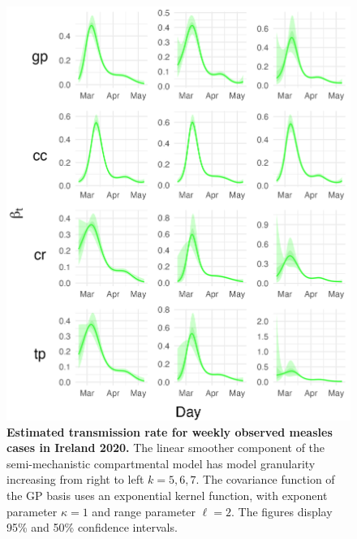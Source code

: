 \documentclass[
11pt, %
oneside, %
english, %
singlespacing, %
]{macthesis} %
\begin{document}
\begin{figure}[H]
\centering
\includegraphics[width=\textwidth, height = \textwidth]{figure/Ireland/Ireland_plot_gp(-3,5)_k(5,6,7)_gamma(014)_I0(10)_plot_beta.png}
\caption[Estimated Covid-19 Transmission Rate (2020)]{\textbf{Estimated transmission rate for weekly observed measles cases in Ireland 2020.} The linear smoother component of the semi-mechanistic compartmental model has model granularity increasing from right to left \(k= 5,6,7\). The covariance function of the GP basis uses an exponential kernel function, with exponent parameter \(\kappa = 1\) and range parameter \(\ell = 2\). The figures display 95\% and 50\% confidence intervals.}
\label{fig:ireland_trans}
\end{figure}
\end{document}
